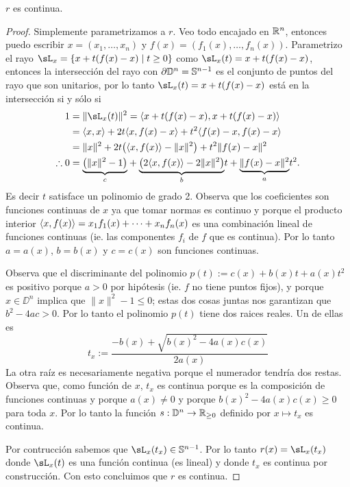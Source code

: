 \begin{ejercicio}\label{ej:77}
  $r$ es continua.
\end{ejercicio}
\begin{proof}%
  Simplemente parametrizamos a $r$. Veo todo encajado en $\mathbb{R}^n$, entonces puedo escribir
  $x=(x_1,\ldots,x_n)$ y $f(x)=(f_1(x),\ldots,f_n(x))$. Parametrizo el rayo
  $\sL_x=\{x+t(f(x)-x)\mid t\geq 0\}$ como $\sL_x(t)=x+t(f(x)-x)$, entonces la intersecci\'on
  del rayo con $\partial\mathbb{D}^n=\mathbb{S}^{n-1}$ es el conjunto de puntos
  del rayo que son unitarios, por lo tanto $\sL_x(t)=x+t(f(x)-x)$ est\'a en la intersecci\'on
  si y s\'olo si
  \begin{align*}
    1&=\|\sL_x(t)\|^2=
    \gen{x+t(f(x)-x),x+t(f(x)-x)}\\ & =
    \gen{x,x}+2t\gen{x,f(x)-x}+t^2\gen{f(x)-x,f(x)-x}\\ & =
    \|x\|^2+2t\big(\gen{x,f(x)}-\|x\|^2 \big)+t^2\|f(x)-x\|^2\\
    \therefore 0 &= \underset{c}{\underbrace{\big(\|x\|^2-1\big)}}+
    \underset{b}{\underbrace{\big(2\gen{x,f(x)}-2\|x\|^2\big)}}t+
    \underset{a}{\underbrace{\|f(x)-x\|^2}}t^2.
  \end{align*}
  Es decir $t$ satisface un polinomio de grado 2. Observa que los coeficientes son
  funciones continuas de $x$ ya que tomar normas es continuo y porque el producto
  interior $\langle x,f(x) \rangle=x_1f_1(x)+\cdots+x_nf_n(x)$ es una combinaci\'on lineal de
  funciones continuas (ie. las componentes $f_i$ de $f$ que es continua). Por lo tanto
  $a=a(x)$, $b=b(x)$ y $c=c(x)$ son funciones continuas.

  Observa que el discriminante del polinomio $p(t):=c(x)+b(x)t+a(x)t^2$ es positivo porque
  $a>0$ por hip\'otesis (ie. $f$ no tiene puntos fijos), y porque $x\in\DD^n$ implica que
  $\|x\|^2-1\leq 0$; estas dos cosas juntas nos garantizan que $b^2-4ac>0$. Por lo tanto
  el polinomio $p(t)$ tiene dos raices reales. Un de ellas es
  \[
    t_x:=\frac{-b(x)+\sqrt{b(x)^2-4a(x)c(x)}}{2a(x)}
  \]
  La otra ra\'iz es necesariamente negativa porque el numerador tendr\'ia dos restas.
  Observa que, como funci\'on de $x$, $t_x$ es continua porque es la composici\'on de
  funciones continuas y porque $a(x)\neq 0$ y porque $b(x)^2-4a(x)c(x)\geq 0$ para toda $x$.
  Por lo tanto la funci\'on $s:\mathbb{D}^n\rightarrow\mathbb{R}_{\geq 0}$ definido por $x\mapsto t_x$ es continua.

  Por contrucci\'on sabemos que $\sL_x(t_x)\in\Sn^{n-1}$. Por lo tanto $r(x)=\sL_x(t_x)$
  donde $\sL_x(t)$ es una funci\'on continua (es lineal) y donde $t_x$ es continua por
  construcci\'on. Con esto concluimos que $r$ es continua.   
\end{proof}%